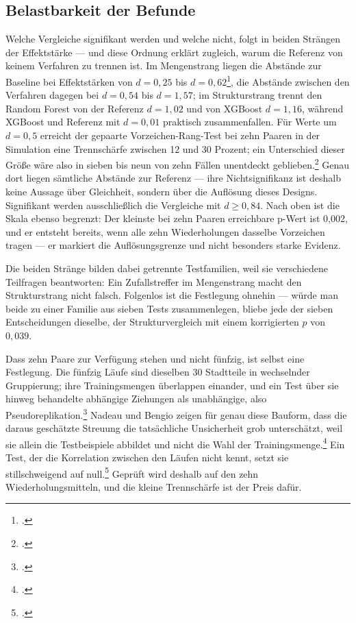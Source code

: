 \documentclass[12pt,a4paper]{article}
\begin{document}
\subsection{Belastbarkeit der Befunde}
\label{sec:belastbarkeit}

Welche Vergleiche signifikant werden und welche nicht, folgt in beiden Strängen der Effektstärke --- und diese Ordnung erklärt zugleich, warum die Referenz von keinem Verfahren zu trennen ist. Im Mengenstrang liegen die Abstände zur Baseline bei Effektstärken von $d = 0{,}25$ bis $d = 0{,}62$\footcite[]{Cohen1988}, die Abstände zwischen den Verfahren dagegen bei $d = 0{,}54$ bis $d = 1{,}57$; im Strukturstrang trennt den Random Forest von der Referenz $d = 1{,}02$ und von XGBoost $d = 1{,}16$, während XGBoost und Referenz mit $d = 0{,}01$ praktisch zusammenfallen. Für Werte um $d = 0{,}5$ erreicht der gepaarte Vorzeichen-Rang-Test bei zehn Paaren in der Simulation eine Trennschärfe zwischen 12 und 30 Prozent; ein Unterschied dieser Größe wäre also in sieben bis neun von zehn Fällen unentdeckt geblieben.\footcite[485]{Altman1995} Genau dort liegen sämtliche Abstände zur Referenz --- ihre Nichtsignifikanz ist deshalb keine Aussage über Gleichheit, sondern über die Auflösung dieses Designs. Signifikant werden ausschließlich die Vergleiche mit $d \geq 0{,}84$. Nach oben ist die Skala ebenso begrenzt: Der kleinste bei zehn Paaren erreichbare p-Wert ist 0,002, und er entsteht bereits, wenn alle zehn Wiederholungen dasselbe Vorzeichen tragen --- er markiert die Auflösungsgrenze und nicht besonders starke Evidenz.

Die beiden Stränge bilden dabei getrennte Testfamilien, weil sie verschiedene
Teilfragen beantworten: Ein Zufallstreffer im Mengenstrang macht den
Strukturstrang nicht falsch. Folgenlos ist die Festlegung ohnehin --- würde man
beide zu einer Familie aus sieben Tests zusammenlegen, bliebe jede der sieben
Entscheidungen dieselbe, der Strukturvergleich mit einem korrigierten $p$ von
$0{,}039$.

Dass zehn Paare zur Verfügung stehen und nicht fünfzig, ist selbst eine Festlegung. Die fünfzig Läufe sind dieselben 30 Stadtteile in wechselnder Gruppierung; ihre Trainingsmengen überlappen einander, und ein Test über sie hinweg behandelte abhängige Ziehungen als unabhängige, also Pseudoreplikation.\footcite[187]{Hurlbert1984} Nadeau und Bengio zeigen für genau diese Bauform, dass die daraus geschätzte Streuung die tatsächliche Unsicherheit grob unterschätzt, weil sie allein die Testbeispiele abbildet und nicht die Wahl der Trainingsmenge.\footcite[239-240]{Nadeau2003} Ein Test, der die Korrelation zwischen den Läufen nicht kennt, setzt sie stillschweigend auf null.\footcite[254]{Nadeau2003} Geprüft wird deshalb auf den zehn Wiederholungsmitteln, und die kleine Trennschärfe ist der Preis dafür.
\end{document}
